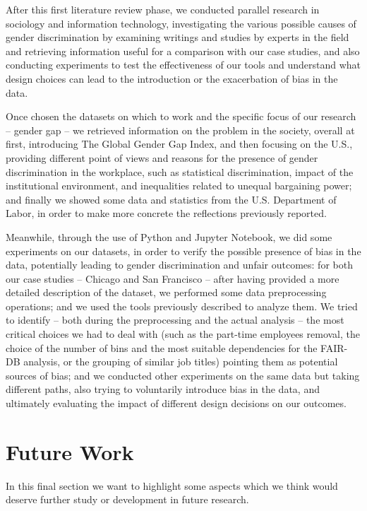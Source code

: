 After this first literature review phase, we conducted parallel research in sociology and information technology, investigating the various possible causes of gender discrimination by examining writings and studies by experts in the field and retrieving information useful for a comparison with our case studies, and also conducting experiments to test the effectiveness of our tools and understand what design choices can lead to the introduction or the exacerbation of bias in the data.

Once chosen the datasets on which to work and the specific focus of our research -- gender gap -- we retrieved information on the problem in the society, overall at first, introducing The Global Gender Gap Index, and then focusing on the U.S., providing different point of views and reasons for the presence of gender discrimination in the workplace, such as statistical discrimination, impact of the institutional environment, and inequalities related to unequal bargaining power; and finally we showed some data and statistics from the U.S. Department of Labor, in order to make more concrete the reflections previously reported.

Meanwhile, through the use of Python and Jupyter Notebook, we did some experiments on our datasets, in order to verify the possible presence of bias in the data, potentially leading to gender discrimination and unfair outcomes: for both our case studies -- Chicago and San Francisco -- after having provided a more detailed description of the dataset, we performed some data preprocessing operations; and we used the tools previously described to analyze them. We tried to identify -- both during the preprocessing and the actual analysis -- the most critical choices we had to deal with (such as the part-time employees removal, the choice of the number of bins and the most suitable dependencies for the FAIR-DB analysis, or the grouping of similar job titles) pointing them as potential sources of bias; and we conducted other experiments on the same data but taking different paths, also trying to voluntarily introduce bias in the data, and ultimately evaluating the impact of different design decisions on our outcomes.


\section{Future Work}
In this final section we want to highlight some aspects which we think would deserve further study or development in future research.

